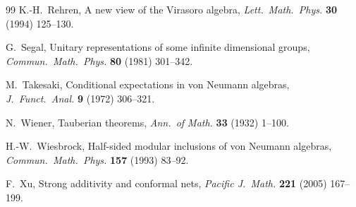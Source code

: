 \documentclass[12pt]{article}
\theoremstyle{definition}
\theoremstyle{remark}
\begin{document}
\begin{thebibliography}{99}
K.-H.~Rehren, A new view of the Virasoro algebra, \emph{Lett.\ Math.\ Phys.} \textbf{30}
(1994) 125--130.

G.~Segal, Unitary representations of some infinite dimensional groups, \emph{Commun.\
Math.\ Phys.} \textbf{80} (1981) 301--342.

M.~Takesaki, Conditional expectations in von Neumann algebras, \emph{J.\ Funct.\ Anal.}
\textbf{9} (1972) 306--321.

N.~Wiener, Tauberian theorems, \emph{Ann.\ of Math.} \textbf{33} (1932) 1--100.

H.-W.~Wiesbrock, Half-sided modular inclusions of von Neumann algebras, \emph{Commun.\
Math.\ Phys.} \textbf{157} (1993) 83--92.

F.~Xu, Strong additivity and conformal nets, \emph{Pacific J.\ Math.} \textbf{221}
(2005) 167--199.

\end{thebibliography}
\end{document}
